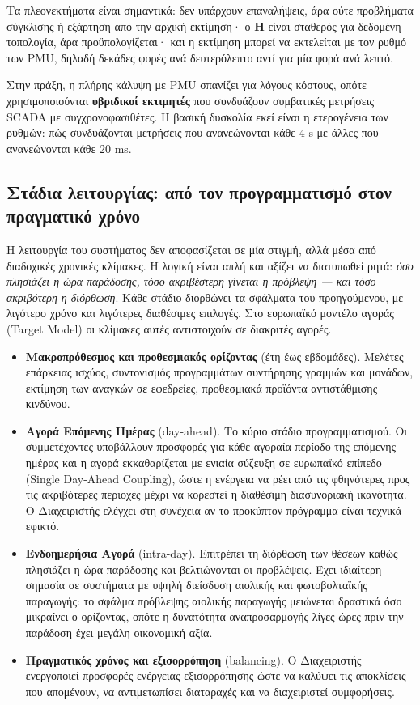 Τα πλεονεκτήματα είναι σημαντικά: δεν υπάρχουν επαναλήψεις, άρα ούτε προβλήματα σύγκλισης
ή εξάρτηση από την αρχική εκτίμηση· ο $\mathbf{H}$ είναι σταθερός για δεδομένη τοπολογία,
άρα προϋπολογίζεται· και η εκτίμηση μπορεί να εκτελείται με τον ρυθμό των PMU, δηλαδή
δεκάδες φορές ανά δευτερόλεπτο αντί για μία φορά ανά λεπτό.

Στην πράξη, η πλήρης κάλυψη με PMU σπανίζει για λόγους κόστους, οπότε χρησιμοποιούνται
\textbf{υβριδικοί εκτιμητές} που συνδυάζουν συμβατικές μετρήσεις SCADA με συγχρονοφασιθέτες.
Η βασική δυσκολία εκεί είναι η ετερογένεια των ρυθμών: πώς συνδυάζονται μετρήσεις που
ανανεώνονται κάθε 4 s με άλλες που ανανεώνονται κάθε 20 ms.

\subsection{Στάδια λειτουργίας: από τον προγραμματισμό στον πραγματικό χρόνο}

Η λειτουργία του συστήματος δεν αποφασίζεται σε μία στιγμή, αλλά μέσα από διαδοχικές
χρονικές κλίμακες. Η λογική είναι απλή και αξίζει να διατυπωθεί ρητά: \emph{όσο πλησιάζει η
ώρα παράδοσης, τόσο ακριβέστερη γίνεται η πρόβλεψη — και τόσο ακριβότερη η διόρθωση}. Κάθε
στάδιο διορθώνει τα σφάλματα του προηγούμενου, με λιγότερο χρόνο και λιγότερες διαθέσιμες
επιλογές. Στο ευρωπαϊκό μοντέλο αγοράς (Target Model) οι κλίμακες αυτές αντιστοιχούν σε
διακριτές αγορές.

\begin{itemize}
\item \textbf{Μακροπρόθεσμος και προθεσμιακός ορίζοντας} (έτη έως εβδομάδες). Μελέτες
      επάρκειας ισχύος, συντονισμός προγραμμάτων συντήρησης γραμμών και μονάδων, εκτίμηση
      των αναγκών σε εφεδρείες, προθεσμιακά προϊόντα αντιστάθμισης κινδύνου.
\item \textbf{Αγορά Επόμενης Ημέρας} (day-ahead). Το κύριο στάδιο προγραμματισμού. Οι
      συμμετέχοντες υποβάλλουν προσφορές για κάθε αγοραία περίοδο της επόμενης ημέρας και η
      αγορά εκκαθαρίζεται με ενιαία σύζευξη σε ευρωπαϊκό επίπεδο (Single Day-Ahead Coupling),
      ώστε η ενέργεια να ρέει από τις φθηνότερες προς τις ακριβότερες περιοχές μέχρι να
      κορεστεί η διαθέσιμη διασυνοριακή ικανότητα. Ο Διαχειριστής ελέγχει στη συνέχεια αν
      το προκύπτον πρόγραμμα είναι τεχνικά εφικτό.
\item \textbf{Ενδοημερήσια Αγορά} (intra-day). Επιτρέπει τη διόρθωση των θέσεων καθώς
      πλησιάζει η ώρα παράδοσης και βελτιώνονται οι προβλέψεις. Έχει ιδιαίτερη σημασία σε
      συστήματα με υψηλή διείσδυση αιολικής και φωτοβολταϊκής παραγωγής: το σφάλμα πρόβλεψης
      αιολικής παραγωγής μειώνεται δραστικά όσο μικραίνει ο ορίζοντας, οπότε η δυνατότητα
      αναπροσαρμογής λίγες ώρες πριν την παράδοση έχει μεγάλη οικονομική αξία.
\item \textbf{Πραγματικός χρόνος και εξισορρόπηση} (balancing). Ο Διαχειριστής ενεργοποιεί
      προσφορές ενέργειας εξισορρόπησης ώστε να καλύψει τις αποκλίσεις που απομένουν, να
      αντιμετωπίσει διαταραχές και να διαχειριστεί συμφορήσεις.
\end{itemize}

